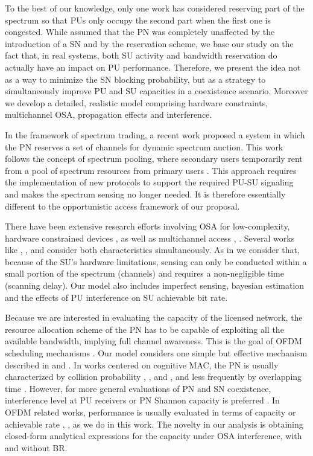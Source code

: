 To the best of our knowledge, only one work \cite{ref:Tang2006} has considered reserving part of the spectrum so that PUs only occupy the second part when the first one is congested.
While \cite{ref:Tang2006} assumed that the PN was completely unaffected by the introduction of a SN and by the reservation scheme, we base our study on the fact that, in real systems, both SU activity and bandwidth reservation do actually have an impact on PU performance. Therefore, we present the idea not as a way to minimize the SN blocking probability, but as a strategy to simultaneously improve PU and SU capacities in a coexistence scenario. Moreover we develop a detailed, realistic model comprising hardware constraints, multichannel OSA, propagation effects and interference.

In the framework of spectrum trading, a recent work \cite{ref:Wu2012} proposed a system in which the PN reserves a set of channels for dynamic spectrum auction. This work follows the concept of spectrum pooling, where secondary users temporarily rent from a pool of spectrum resources from primary users \cite{ref:Biglieri2012}. This approach requires the implementation of new protocols to support the required PU-SU signaling and makes the spectrum sensing no longer needed. It is therefore essentially different to the opportunistic access framework of our proposal.

There have been extensive research efforts involving OSA for low-complexity, hardware constrained devices \cite{ref:Park2011}, \cite{ref:Li2012} as well as multichannel access \cite{ref:Jeon2012}, \cite{ref:Xu2012_eff}. 
Several works like \cite{ref:Jia2008_HC}, \cite{ref:Kim2008}, \cite{ref:Gabran2011} and \cite{ref:Cheng2011} consider both characteristics simultaneously. As in \cite{ref:Jia2008_HC} we consider that, because of the SU's hardware limitations, sensing can only be conducted within a small portion of the spectrum (channels) and requires a non-negligible time (scanning delay). Our model also includes imperfect sensing, bayesian estimation and the effects of PU interference on SU achievable bit rate.  


Because we are interested in evaluating the capacity of the licensed network, the resource allocation scheme of the PN has to be capable of exploiting all the available bandwidth, implying full channel awareness. This is the goal of OFDM scheduling mechanisms \cite{ref:Sadr2009}. Our model considers one simple but effective mechanism described in \cite{ref:Sadr2009} and \cite{ref:Rhee2000}.
In works centered on cognitive MAC, the PN is usually characterized by collision probability \cite{ref:Gabran2011}, \cite{ref:Jung2012}, \cite{ref:Zhao2007_dec} and \cite{ref:Huang2009}, and less frequently by overlapping time \cite{ref:Huang2008_opp}.
However, for more general evaluations of PN and SN coexistence, interference level at PU receivers or PN Shannon capacity is preferred \cite{ref:Sun2012}. In OFDM related works, performance is usually evaluated in terms of capacity or achievable rate \cite{ref:Sadr2009}, \cite{ref:Rhee2000}, as we do in this work. The novelty in our analysis is obtaining closed-form analytical expressions for the capacity under OSA interference, with and without BR.


